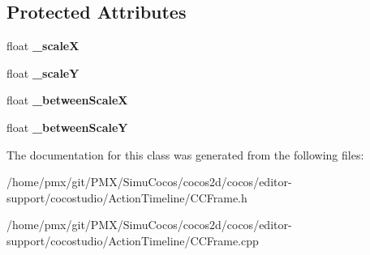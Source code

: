 \subsection*{Protected Attributes}
\begin{DoxyCompactItemize}
\item 
\mbox{\label{classScaleFrame_a669225a1e77ffcd08b093b004fa3fd12}} 
float {\bfseries \+\_\+scaleX}
\item 
\mbox{\label{classScaleFrame_a48ad762e996016f7710828451057cd1f}} 
float {\bfseries \+\_\+scaleY}
\item 
\mbox{\label{classScaleFrame_aff6a81ac087ef6f09f4cd138591872a5}} 
float {\bfseries \+\_\+between\+ScaleX}
\item 
\mbox{\label{classScaleFrame_a2e96b5793e033319bfca761ff3351e24}} 
float {\bfseries \+\_\+between\+ScaleY}
\end{DoxyCompactItemize}


The documentation for this class was generated from the following files\+:\begin{DoxyCompactItemize}
\item 
/home/pmx/git/\+P\+M\+X/\+Simu\+Cocos/cocos2d/cocos/editor-\/support/cocostudio/\+Action\+Timeline/C\+C\+Frame.\+h\item 
/home/pmx/git/\+P\+M\+X/\+Simu\+Cocos/cocos2d/cocos/editor-\/support/cocostudio/\+Action\+Timeline/C\+C\+Frame.\+cpp\end{DoxyCompactItemize}

